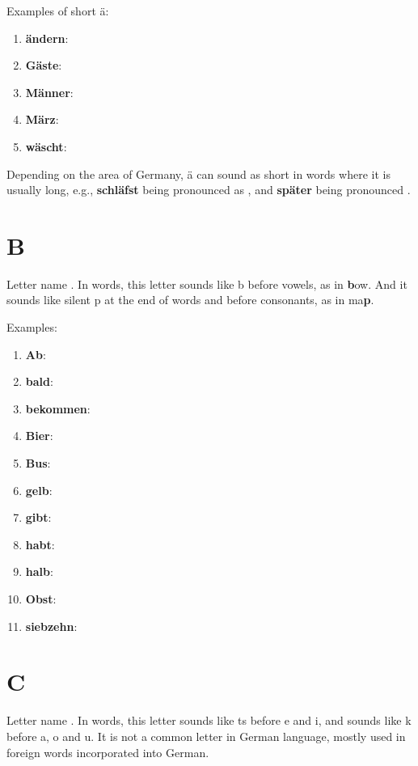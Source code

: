 Examples of short ä:
\begin{enumerate}
    \item \textbf{ändern}: \textipa{["End@rn]}
    \item \textbf{Gäste}: \textipa{["gEst@]}
    \item \textbf{Männer}: \textipa{["mEn@r]}
    \item \textbf{März}: \textipa{[mErts]}
    \item \textbf{wäscht}: \textipa{[vESt]}
\end{enumerate}

Depending on the area of Germany, ä can sound as short in words where it is usually long, e.g., \textbf{schläfst} being pronounced as \textipa{["SlEfst]}, and \textbf{später} being pronounced \textipa{["SpEt@r]}.

\section*{B}

Letter name \textipa{[be:]}. In words, this letter sounds like b before vowels, as in \textbf{b}ow. And it sounds like silent p at the end of words and before consonants, as in ma\textbf{p}.

Examples:
\begin{enumerate}
    \item \textbf{Ab}: \textipa{[ap]}
    \item \textbf{bald}: \textipa{[balt]}
    \item \textbf{bekommen}: \textipa{[be"kOm@n]}
    \item \textbf{Bier}: \textipa{[bi:r]}
    \item \textbf{Bus}: \textipa{[bUs]}
    \item \textbf{gelb}: \textipa{[gElp]}
    \item \textbf{gibt}: \textipa{[gIpt]}
    \item \textbf{habt}: \textipa{[hapt]}
    \item \textbf{halb}: \textipa{[halp]}
    \item \textbf{Obst}: \textipa{[o:pst]}
    \item \textbf{siebzehn}: \textipa{["zi:ptse:n]}
\end{enumerate}

\section*{C}

Letter name \textipa{[tse:]}. In words, this letter sounds like ts before e and i, and sounds like k before a, o and u. It is not a common letter in German language, mostly used in foreign words incorporated into German.

